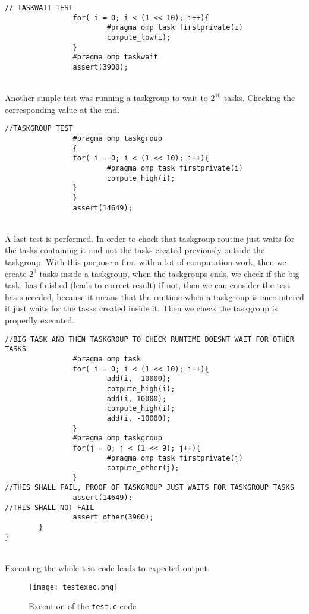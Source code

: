 \begin{lstlisting}[caption=Simple taskwait test, label=testtaskwait]
                // TASKWAIT TEST
                for( i = 0; i < (1 << 10); i++){
                        #pragma omp task firstprivate(i)
                        compute_low(i);
                }
                #pragma omp taskwait
                assert(3900);
\end{lstlisting}
\par ~\\
Another simple test was running a taskgroup to wait to $2^{10}$ tasks. Checking the corresponding value at the end.
\begin{lstlisting}[caption=Simple taskgroup test, label=testtaskgroup]
                //TASKGROUP TEST
                #pragma omp taskgroup
                {
                for( i = 0; i < (1 << 10); i++){
                        #pragma omp task firstprivate(i)
                        compute_high(i); 
                }
                }
                assert(14649);
\end{lstlisting}
\par ~\\
A last test is performed. In order to check that taskgroup routine just waits for the tasks containing it and not the tasks created previously outside the taskgroup. With this purpose a first with a lot of computation work, then we create $2^9$ tasks inside a taskgroup, when the taskgroups ends, we check if the big task, has finished (leads to correct result) if not, then we can consider the test has succeded, because it means that the runtime when a taskgroup is encountered it just waits for the tasks created inside it. Then we check the taskgroup is properlly executed.
\begin{lstlisting}[caption=Taskgroup just waits for tasks created inside it test,label=testtaskgroupwait]
//BIG TASK AND THEN TASKGROUP TO CHECK RUNTIME DOESNT WAIT FOR OTHER TASKS
                #pragma omp task 
                for( i = 0; i < (1 << 10); i++){
                        add(i, -10000);
                        compute_high(i);
                        add(i, 10000);
                        compute_high(i);
                        add(i, -10000);
                }
                #pragma omp taskgroup
                for(j = 0; j < (1 << 9); j++){
                        #pragma omp task firstprivate(j)
                        compute_other(j);
                }
//THIS SHALL FAIL, PROOF OF TASKGROUP JUST WAITS FOR TASKGROUP TASKS
                assert(14649);
//THIS SHALL NOT FAIL
                assert_other(3900);
        }
}
\end{lstlisting}
\par ~\\
Executing the whole test code leads to expected output.
\begin{figure}[h!]
    \centering
    \texttt{[image: testexec.png]}
    \caption{Execution of the \texttt{test.c} code}
\end{figure}
\clearpage
